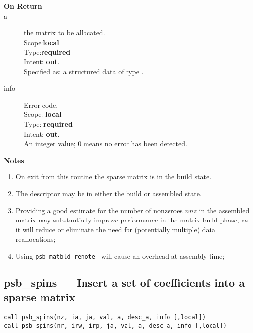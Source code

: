 \begin{description}
\item[\bf On Return]
\item[a] the matrix to be allocated.\\
Scope:{\bf local}\\
Type:{\bf required}\\
Intent: {\bf out}.\\
Specified as: a structured data of type \spdata.
\item[info] Error code.\\
Scope: {\bf local} \\
Type: {\bf required} \\
Intent: {\bf out}.\\
An integer value; 0 means no error has been detected. 
\end{description}
{\par\noindent\large\bfseries Notes}
\begin{enumerate}
\item On exit from this routine the sparse matrix  is in the build
  state.
\item The descriptor may be in either the build or assembled state.
\item Providing a good estimate for the number of nonzeroes $nnz$ in
  the assembled matrix may substantially improve performance in the
  matrix build phase, as it will reduce or eliminate the need for
  (potentially multiple) data reallocations;
\item Using \verb|psb_matbld_remote_| will cause an overhead at
  assembly time;
\end{enumerate}



%
%
\clearpage\subsection{psb\_spins --- Insert a set of coefficients into a sparse
  matrix}

\begin{verbatim}
call psb_spins(nz, ia, ja, val, a, desc_a, info [,local])
call psb_spins(nr, irw, irp, ja, val, a, desc_a, info [,local])
\end{verbatim}


